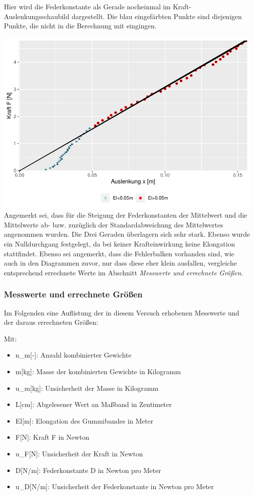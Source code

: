 \documentclass[
  9pt,
]{article}
\providecommand{\tightlist}{%
  \setlength{\itemsep}{0pt}\setlength{\parskip}{0pt}}
\begin{document}
Hier wird die Federkonstante als Gerade nocheinmal im
Kraft-Auslenkungsschaubild dargestellt. Die blau eingefärbten Punkte
sind diejenigen Punkte, die nicht in die Berechnung mit eingingen.

\includegraphics{DehnbareStoffe_files/figure-latex/unnamed-chunk-10-1.pdf}
Angemerkt sei, dass für die Steigung der Federkonstanten der Mittelwert
und die Mittelwerte ab- bzw. zuzüglich der Standardabweichung des
Mittelwertes angenommen wurden. Die Drei Geraden überlagern sich sehr
stark. Ebenso wurde ein Nulldurchgang festgelegt, da bei keiner
Krafteinwirkung keine Elongation stattfindet. Ebenso sei angemerkt, dass
die Fehlerbalken vorhanden sind, wie auch in den Diagrammen zuvor, nur
dass diese eher klein ausfallen, vergleiche entsprechend errechnete
Werte im Abschnitt \textit{Messwerte und errechnete Größen}.

\hypertarget{messwerte-und-errechnete-gruxf6uxdfen}{%
\subsubsection{Messwerte und errechnete
Größen}\label{messwerte-und-errechnete-gruxf6uxdfen}}

Im Folgenden eine Auflistung der in diesem Versuch erhobenen Messwerte
und der daraus errechneten Größen:

Mit:

\begin{itemize}
\tightlist
\item
  n\_m{[}-{]}: Anzahl kombinierter Gewichte
\item
  m{[}kg{]}: Masse der kombinierten Gewichte in Kilogramm
\item
  u\_m{[}kg{]}: Unsicherheit der Masse in Kilogramm
\item
  L{[}cm{]}: Abgelesener Wert an Maßband in Zentimeter
\item
  El{[}m{]}: Elongation des Gummibandes in Meter
\item
  F{[}N{]}: Kraft F in Newton
\item
  u\_F{[}N{]}: Unsicherheit der Kraft in Newton
\item
  D{[}N/m{]}: Federkonstante D in Newton pro Meter
\item
  u\_D{[}N/m{]}: Unsicherheit der Federkonstante in Newton pro Meter
\end{itemize}
\end{document}
